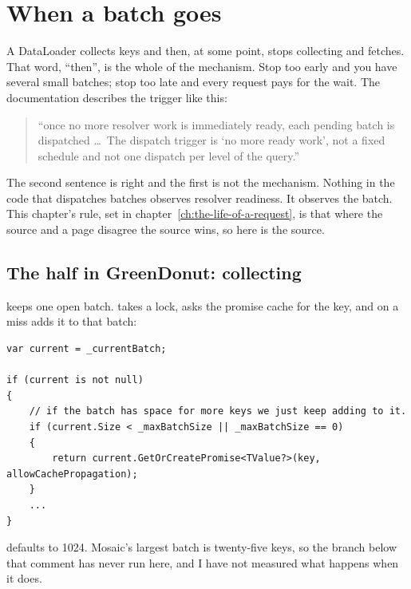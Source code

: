 \section{When a batch goes}
\label{sec:ch04-when-a-batch-goes}

A DataLoader collects keys and then, at some point, stops collecting and
fetches. That word, \enquote{then}, is the whole of the mechanism. Stop too
early and you have several small batches; stop too late and every request pays
for the wait. The documentation describes the trigger like this:

\begin{quote}
\enquote{once no more resolver work is immediately ready, each pending batch is
dispatched \dots\ The dispatch trigger is \enquote{no more ready work}, not a
fixed schedule and not one dispatch per level of the
query.}~\autocite{chillicream2026dataloaderdocs}
\end{quote}

The second sentence is right and the first is not the mechanism. Nothing in the
code that dispatches batches observes resolver readiness. It observes the batch.
This chapter's rule, set in chapter~\ref{ch:the-life-of-a-request}, is that where
the source and a page disagree the source wins, so here is the source.

\subsection*{The half in GreenDonut: collecting}

%
 keeps one open batch.  takes
a lock, asks the promise cache for the key, and on a miss adds it to that batch:

\begin{verbatim}
var current = _currentBatch;

if (current is not null)
{
    // if the batch has space for more keys we just keep adding to it.
    if (current.Size < _maxBatchSize || _maxBatchSize == 0)
    {
        return current.GetOrCreatePromise<TValue?>(key, allowCachePropagation);
    }
    ...
}
\end{verbatim}

 defaults to 1024. Mosaic's largest batch is twenty-five keys,
so the branch below that comment has never run here, and I have not measured what
happens when it does.

